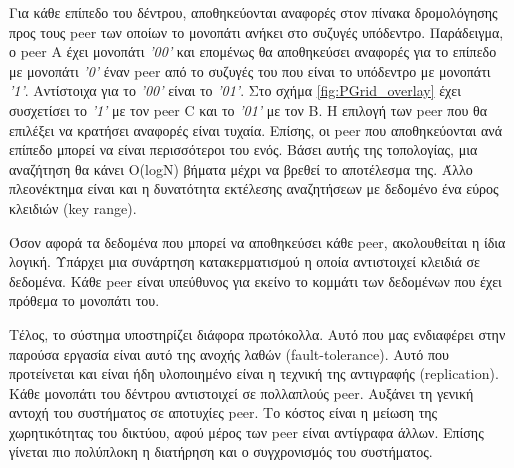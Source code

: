 Για κάθε επίπεδο του δέντρου, αποθηκεύονται αναφορές στον πίνακα 
δρομολόγησης προς τους peer των οποίων το μονοπάτι ανήκει στο συζυγές 
υπόδεντρο. Παράδειγμα, ο peer Α έχει μονοπάτι \textit{'00'} και επομένως θα 
αποθηκεύσει αναφορές για το επίπεδο με μονοπάτι \textit{'0'} έναν peer από το 
συζυγές του που είναι το υπόδεντρο με μονοπάτι \textit{'1'}. Αντίστοιχα για το 
\textit{'00'} είναι το \textit{'01'}. Στο σχήμα \ref{fig:PGrid_overlay} έχει 
συσχετίσει το \textit{'1'} με τον peer C και το \textit{'01'} με τον B. 
Η επιλογή των peer που θα επιλέξει να κρατήσει αναφορές είναι τυχαία. Επίσης, 
οι peer που αποθηκεύονται ανά επίπεδο μπορεί να είναι περισσότεροι του ενός. 
Βάσει αυτής της τοπολογίας, μια αναζήτηση θα κάνει Ο(logN) βήματα μέχρι να 
βρεθεί το αποτέλεσμα της. Άλλο πλεονέκτημα είναι και η δυνατότητα εκτέλεσης 
αναζητήσεων με δεδομένο ένα εύρος κλειδιών (key range).

Όσον αφορά τα δεδομένα που μπορεί να αποθηκεύσει κάθε peer, 
ακολουθείται η ίδια λογική. Υπάρχει μια συνάρτηση κατακερματισμού η 
οποία αντιστοιχεί κλειδιά σε δεδομένα. Κάθε peer είναι υπεύθυνος για 
εκείνο το κομμάτι των δεδομένων που έχει πρόθεμα το μονοπάτι του.

Τέλος, το σύστημα υποστηρίζει διάφορα πρωτόκολλα. Αυτό που μας 
ενδιαφέρει στην παρούσα εργασία είναι αυτό της ανοχής λαθών 
(fault-tolerance). Αυτό που προτείνεται και είναι ήδη υλοποιημένο είναι 
η τεχνική της αντιγραφής (replication). Κάθε μονοπάτι του δέντρου 
αντιστοιχεί σε πολλαπλούς peer. Αυξάνει τη γενική αντοχή του συστήματος 
σε αποτυχίες peer. Το κόστος είναι η μείωση της χωρητικότητας του 
δικτύου, αφού μέρος των peer είναι αντίγραφα άλλων. Επίσης γίνεται πιο 
πολύπλοκη η διατήρηση και ο συγχρονισμός του συστήματος. 
